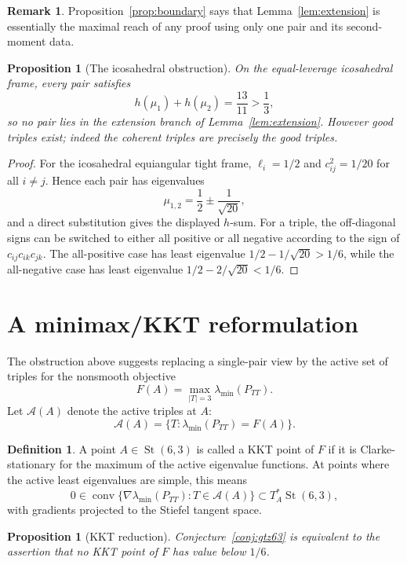 \documentclass[11pt]{article}
\numberwithin{equation}{section}
\newtheorem{proposition}[theorem]{Proposition}
\theoremstyle{definition}
\newtheorem{definition}[theorem]{Definition}
\newtheorem{remark}[theorem]{Remark}
\newcommand{\St}{\operatorname{St}}
\newcommand{\conv}{\operatorname{conv}}
\newcommand{\lmin}{\lambda_{\min}}
\begin{document}
\begin{remark}
Proposition~\ref{prop:boundary} says that Lemma~\ref{lem:extension} is
essentially the maximal reach of any proof using only one pair and its
second-moment data.
\end{remark}

\begin{proposition}[The icosahedral obstruction]\label{prop:ico}
On the equal-leverage icosahedral frame, every pair satisfies
\[
  h(\mu_1)+h(\mu_2)=\frac{13}{11}>\frac13,
\]
so no pair lies in the extension branch of Lemma~\ref{lem:extension}.  However
good triples exist; indeed the coherent triples are precisely the good triples.
\end{proposition}

\begin{proof}
For the icosahedral equiangular tight frame, $\ell_i=1/2$ and
$c_{ij}^2=1/20$ for all $i\ne j$.  Hence each pair has eigenvalues
\[
  \mu_{1,2}=\frac12\pm\frac1{\sqrt{20}},
\]
and a direct substitution gives the displayed $h$-sum.  For a triple, the
off-diagonal signs can be switched to either all positive or all negative
according to the sign of $c_{ij}c_{ik}c_{jk}$.  The all-positive case has
least eigenvalue $1/2-1/\sqrt{20}>1/6$, while the all-negative case has least
eigenvalue $1/2-2/\sqrt{20}<1/6$.
\end{proof}

\section{A minimax/KKT reformulation}

The obstruction above suggests replacing a single-pair view by the active set
of triples for the nonsmooth objective
\[
  F(A)=\max_{|T|=3}\lmin(P_{TT}).
\]
Let $\mathcal A(A)$ denote the active triples at $A$:
\[
  \mathcal A(A)=\{T: \lmin(P_{TT})=F(A)\}.
\]

\begin{definition}
A point $A\in\St(6,3)$ is called a KKT point of $F$ if it is Clarke-stationary
for the maximum of the active eigenvalue functions.  At points where the active
least eigenvalues are simple, this means
\[
  0\in\conv\{\nabla \lmin(P_{TT}):T\in\mathcal A(A)\}
  \subset T_A^*\St(6,3),
\]
with gradients projected to the Stiefel tangent space.
\end{definition}

\begin{proposition}[KKT reduction]\label{prop:kkt}
Conjecture~\ref{conj:gtz63} is equivalent to the assertion that no KKT point of
$F$ has value below $1/6$.
\end{proposition}
\end{document}
